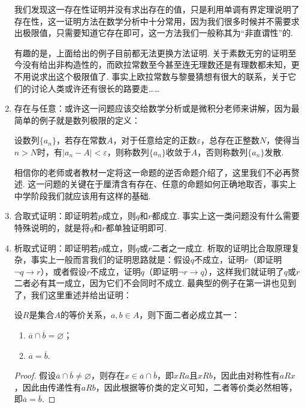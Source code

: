 \begin{enumerate}
    我们发现这一存在性证明并没有求出存在的值，只是利用单调有界定理说明了存在性，这一证明方法在数学分析中十分常用，因为我们很多时候并不需要求出极限值，只需要知道它存在即可，这一方法我们一般称其为``非直谓性''的.

    有趣的是，上面给出的例子目前都无法更换方法证明. 关于素数无穷的证明至今没有给出非构造性的，而欧拉常数至今甚至连无理数还是有理数都未知，更不用说求出这个极限值了. 事实上欧拉常数与黎曼猜想有很大的联系，关于它们的讨论人类或许还有很长的路要走\dots\dots

    \item 存在与任意：或许这一问题应该交给数学分析或是微积分老师来讲解，因为最简单的例子就是数列极限的定义：
    \begin{definition*}
        设数列$\{a_n\}$，若存在常数$A$，对于任意给定的正数$\varepsilon$，总存在正整数$N$，使得当$n>N$时，有$|a_n-A|<\varepsilon$，则称数列$\{a_n\}$收敛于$A$，否则称数列$\{a_n\}$发散.
    \end{definition*}

    相信你的老师或者教材一定将这一命题的逆否命题介绍了，这里我们不必再赘述. 这一问题的关键在于厘清含有存在、任意的命题如何正确地取否，事实上中学阶段我们就应该用有这样的基础.

    \item 合取式证明：即证明若$p$成立，则$q$和$r$都成立. 事实上这一类问题没有什么需要特殊说明的，就是将$q$和$r$都单独证明即可.

    \item 析取式证明：即证明若$p$成立，则$q$或$r$二者之一成立. 析取的证明比合取原理复杂，事实上一般而言我们的证明思路就是：假设$q$不成立，证明$r$（即证明$\lnot q\to r$），或者假设$r$不成立，证明$q$（即证明$\lnot r\to q$），这样我们就证明了$q$或$r$二者必有其一成立，因为它们不会同时不成立. 最典型的例子在第一讲也见到了，我们这里重述并给出证明：
    \begin{theorem*}
        设$R$是集合$A$的等价关系，$a,b\in A$，则下面二者必成立其一：
        \begin{enumerate}
            \item $\overline{a}\cap\overline{b}=\varnothing$；
            \item $\overline{a}=\overline{b}$.
        \end{enumerate}
    \end{theorem*}
    \begin{proof}
        假设$\overline{a}\cap\overline{b}\neq\varnothing$，则存在$x\in\overline{a}\cap\overline{b}$，即$xRa$且$xRb$，因此由对称性有$aRx$，因此由传递性有$aRb$，因此根据等价类的定义可知，二者等价类必然相等，即$\overline{a}=\overline{b}$.
    \end{proof}


\end{enumerate}
